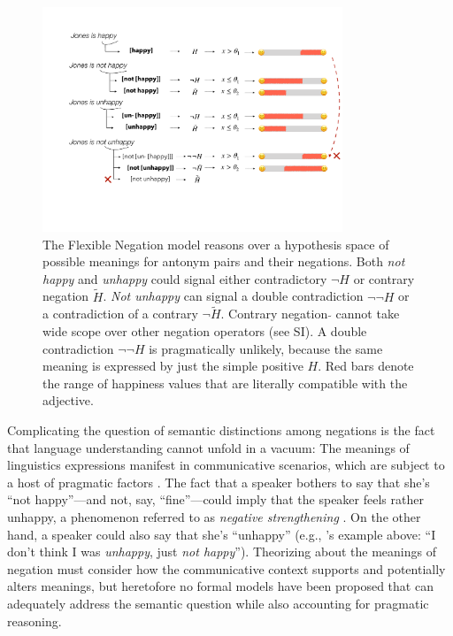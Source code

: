 \documentclass[floatsintext,doc]{apa6}
\newcommand{\ourmodel}{Flexible Negation\xspace}
\begin{document}
\begin{figure}[t]
\centering \includegraphics[width=0.8\textwidth]{figs/schematicMeanings}  
\caption{The \ourmodel model reasons over a hypothesis space of possible meanings for antonym pairs and their negations.
Both \emph{not happy} and \emph{unhappy} could signal either contradictory $\neg H$ or contrary negation $\tilde{H}$.
\emph{Not unhappy} can signal a double contradiction  $\neg \neg H$  or a contradiction of a contrary  $ \neg \tilde{H}$.
Contrary negation $\tilde{}$ cannot take wide scope over other negation operators (see SI). 
A double contradiction  $\neg \neg H$  is pragmatically unlikely, because the same meaning is expressed by just the simple positive $H$.
 Red bars denote the range of happiness values that are literally compatible with the adjective.
}
\label{fig:meanings}
\end{figure}

Complicating the question of semantic distinctions among negations is the fact that language understanding cannot unfold in a vacuum: The meanings of linguistics expressions manifest in communicative scenarios, which are subject to a host of pragmatic factors \cite{Grice1975, clark1996using, levinson2000presumptive}.
The fact that a speaker bothers to say that she's ``not happy''---and not, say, ``fine''---could imply that the speaker feels rather unhappy, a phenomenon referred to as \emph{negative strengthening} \cite{Horn1989:Natural, Blutner2004:pragmatics, benz2018scalar}.
On the other hand, a speaker could also say that she's ``unhappy'' (e.g., 's example above: ``I don't think I was \emph{unhappy}, just \emph{not happy}'').
Theorizing about the meanings of negation must consider how the communicative context supports and potentially alters meanings, but heretofore no formal models have been proposed that can adequately address the semantic question while also accounting for pragmatic reasoning.
\end{document}
